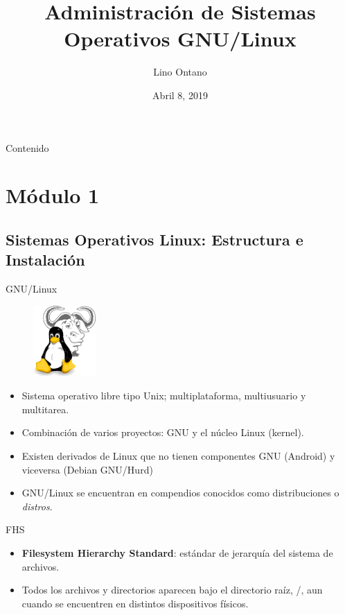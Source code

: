 \documentclass{beamer}
\title[Administración GNU/Linux]{Administración de Sistemas Operativos GNU/Linux}
\author{Lino Ontano}
\date{Abril 8, 2019}
\begin{document}
\begin{frame}
  \titlepage
\end{frame}

\begin{frame}{Contenido}
  \tableofcontents
\end{frame}

\section{Módulo 1}
\subsection{Sistemas Operativos Linux: Estructura e Instalación}
\begin{frame}{GNU/Linux}
\begin{figure}
	\includegraphics[height=2.7cm]{img/Gnulinux.png}
\end{figure}
\begin{itemize}
\item Sistema operativo libre tipo Unix; multiplataforma, multiusuario y multitarea.
\item Combinación de varios proyectos: GNU y el núcleo Linux (kernel).
\item Existen derivados de Linux que no tienen componentes GNU (Android) y viceversa (Debian GNU/Hurd)
\item GNU/Linux se encuentran en compendios conocidos como distribuciones o \textit{distros}.
\end{itemize}
\end{frame}
\begin{frame}{FHS}
\begin{itemize}
    \item \textbf{Filesystem Hierarchy Standard}: estándar de jerarquía del sistema de archivos. 
    \item Todos los archivos y directorios aparecen bajo el directorio raíz, /, aun cuando se encuentren en distintos dispositivos físicos.
\end{itemize}

\end{frame}
\end{document}
